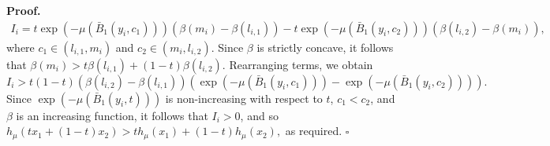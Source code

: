 \documentclass[10pt,a4paper]{amsart}
\renewenvironment{proof}[1]{\par\medskip\noindent\textbf{#1}\enspace\ignorespaces}{\par\medskip}
\newcommand{\death}{{\beta}}
\newcommand{\Halmos}{\hfill$\square$}
\begin{document}
\begin{proof}{Proof.}
\begin{align*}
    I_i = t \exp(-\mu(\bar{B}_1(y_i, c_1))) (\death(m_i) - \death(l_{i,1})) - t \exp(-\mu(\bar{B}_1(y_i, c_2))) (\death(l_{i,2}) - \death(m_i)),
\end{align*}
where \( c_1 \in (l_{i,1}, m_i) \) and \( c_2 \in (m_i, l_{i,2}) \). Since \( \death \) is strictly concave, it follows that $\death(m_i) > t \death(l_{i,1}) + (1 - t) \death(l_{i,2})$. Rearranging terms, we obtain
\[
I_i > t(1 - t)(\death(l_{i,2}) - \death(l_{i,1})) \left( \exp(-\mu(\bar{B}_1(y_i, c_1))) - \exp(-\mu(\bar{B}_1(y_i, c_2))) \right).
\]
Since \( \exp(-\mu(\bar{B}_1(y_i,t))) \) is non-increasing with respect to \( t \), \( c_1 < c_2 \), and \( \death \) is an increasing function, it follows that \( I_i > 0 \), and so 
$h_{\mu}(t x_1 + (1 - t) x_2) > t h_{\mu}(x_1) + (1 - t) h_{\mu}(x_2),$
as required. \hfill \Halmos
\end{proof}
\end{document}
